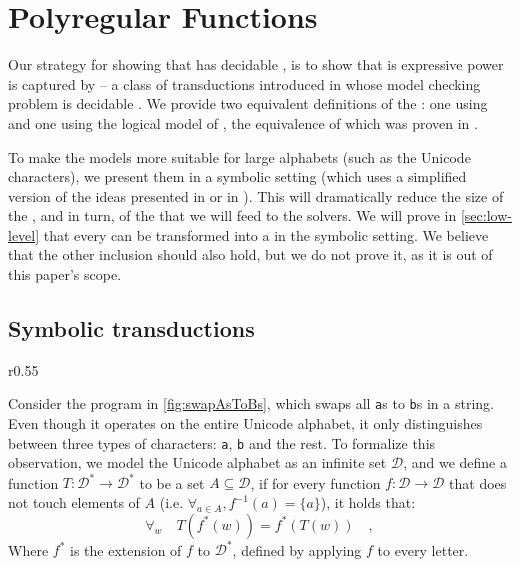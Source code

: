\newpage
\section{Polyregular Functions}
\label{sec:polyregular}

Our strategy for showing that  has decidable ,
is to show that is expressive power is captured by  -- 
a class of transductions introduced in \cite{bojanczyk2018polyregular} whose model checking 
problem is decidable \cite[Theorem~1.7]{bojanczyk2018polyregular}. 
We provide two equivalent definitions of the : one using  \cite[p.
19]{bojanczyk2018polyregular} and one using the logical model of
 \cite[Definition
4]{bojanczyk2019string}, the equivalence of which 
was proven in
\cite{bojanczyk2018polyregular}.

To make the models more suitable for large alphabets (such as the Unicode
characters), we present them in a symbolic setting (which uses a simplified
version of the ideas presented in \cite{d2017power} or in
\cite[Section~3.1]{bojanczyk2023growth}). This will dramatically reduce the
size of the , and in turn, of
the  that we will feed to the solvers. We will prove in
\cref{sec:low-level} that every  can be
transformed into a  in the
symbolic setting. We believe that the other inclusion should also hold,
but we do not prove it, as it is out of this paper's scope.

\subsection{Symbolic transductions}

\begin{wrapfigure}{r}{0.55\textwidth}
    
    \caption{The \texttt{swapAsToBs} program.}
    \label{fig:swapAsToBs}
\end{wrapfigure}

\AP
Consider the program in \cref{fig:swapAsToBs}, which swaps all \texttt{a}s to
\texttt{b}s in a string. Even though it operates on the entire Unicode
alphabet, it only distinguishes between three types of characters: \texttt{a},
\texttt{b} and the rest.
To formalize this observation, we model the Unicode alphabet as an infinite set $\mathcal{D}$, and
we define a function $T : \mathcal{D}^* \to \mathcal{D}^*$ to be
 a set $A \subseteq \mathcal{D}$, if for every function $f:
\mathcal{D} \to \mathcal{D}$ that does not touch elements of $A$ (i.e.
$\forall_{a\in A}, f^{-1}(a) = \{a\}$), it holds that:
\begin{equation*}
    \forall_{w} \quad T(f^*(w)) = f^*(T(w)) \quad ,
\end{equation*}
Where $f^*$ is the extension of $f$ to $\mathcal{D}^*$, defined by applying $f$
to every letter.

